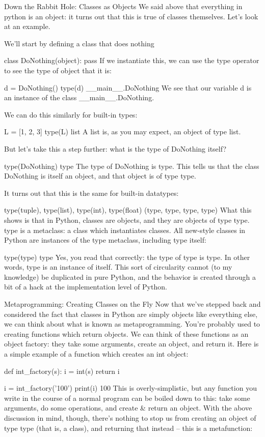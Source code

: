 Down the Rabbit Hole: Classes as Objects
We said above that everything in python is an object: it turns out that this is true of classes themselves. Let's look at an example.

We'll start by defining a class that does nothing

class DoNothing(object):
    pass
If we instantiate this, we can use the type operator to see the type of object that it is:

d = DoNothing()
type(d)
__main__.DoNothing
We see that our variable d is an instance of the class __main__.DoNothing.

We can do this similarly for built-in types:

L = [1, 2, 3]
type(L)
list
A list is, as you may expect, an object of type list.

But let's take this a step further: what is the type of DoNothing itself?

type(DoNothing)
type
The type of DoNothing is type. This tells us that the class DoNothing is itself an object, and that object is of type type.

It turns out that this is the same for built-in datatypes:

type(tuple), type(list), type(int), type(float)
(type, type, type, type)
What this shows is that in Python, classes are objects, and they are objects of type type.  type is a metaclass: a class which instantiates classes. All new-style classes in Python are instances of the type metaclass, including type itself:

type(type)
type
Yes, you read that correctly: the type of type is type. In other words, type is an instance of itself. This sort of circularity cannot (to my knowledge) be duplicated in pure Python, and the behavior is created through a bit of a hack at the implementation level of Python.

Metaprogramming: Creating Classes on the Fly
Now that we've stepped back and considered the fact that classes in Python are simply objects like everything else, we can think about what is known as metaprogramming. You're probably used to creating functions which return objects. We can think of these functions as an object factory: they take some arguments, create an object, and return it. Here is a simple example of a function which creates an int object:

def int_factory(s):
    i = int(s)
    return i

i = int_factory('100')
print(i)
100
This is overly-simplistic, but any function you write in the course of a normal program can be boiled down to this: take some arguments, do some operations, and create & return an object. With the above discussion in mind, though, there's nothing to stop us from creating an object of type type (that is, a class), and returning that instead -- this is a metafunction:

